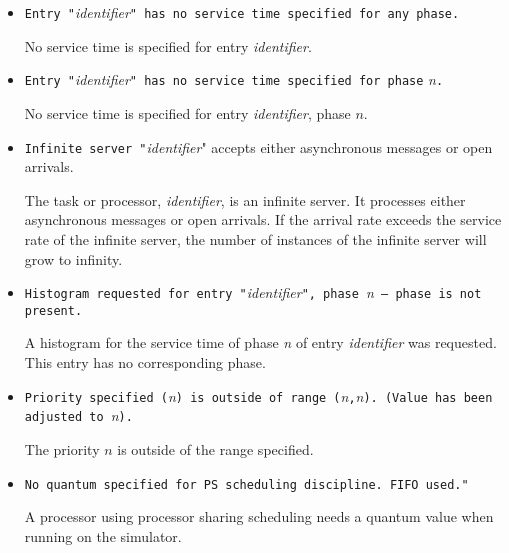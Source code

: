 \begin{itemize}
\item \texttt{Entry "}\emph{identifier}\texttt{" has no service time
    specified for any phase.}
  
  No service time is specified for entry
  \emph{identifier}.

\item \texttt{Entry "}\emph{identifier}\texttt{" has no service time
    specified for phase} \emph{n}\texttt{.}
  
  No service time is specified for entry
  \emph{identifier}, phase $n$.

\item \texttt{Infinite server "}\emph{identifier}{" accepts either asynchronous messages or open arrivals.}

  The task or processor, \emph{identifier}, is an infinite server.  It processes either asynchronous
  messages or open arrivals.  If the arrival rate exceeds the service rate of the infinite server, the
  number of instances of the infinite server will grow to infinity.
  
\item \texttt{Histogram requested for entry "}\emph{identifier}\texttt{", phase~}\emph{n}\texttt{ -- phase is not present.}
  
  A histogram for the service time of phase \emph{n} of entry \emph{identifier} was requested.  This entry
  has no corresponding phase.

\item \texttt{Priority specified (}\emph{n}\texttt{) is outside of
    range (}\emph{n}\texttt{,}\emph{n}\texttt{). (Value has been
    adjusted to }\emph{n}\texttt{).}

  The priority $n$ is outside of the range specified.

\item \texttt{No quantum specified for PS scheduling discipline.  FIFO
    used." }
  
  A processor using processor sharing
  scheduling needs a quantum
  value when running on the
  simulator.


\end{itemize}
